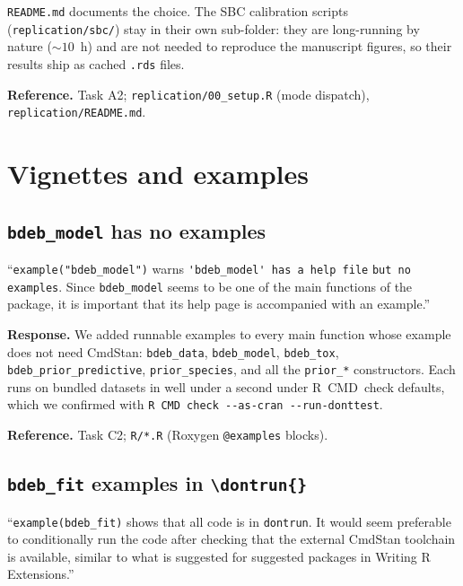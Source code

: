 \documentclass[11pt,a4paper]{article}
\newcommand{\code}[1]{\texttt{#1}}
\begin{document}
\code{README.md} documents the choice. The SBC calibration scripts
(\code{replication/sbc/}) stay in their own sub-folder: they are
long-running by nature ($\sim 10$~h) and are not needed to reproduce the
manuscript figures, so their results ship as cached \code{.rds} files.

\textbf{Reference.} Task A2; \code{replication/00\_setup.R} (mode
dispatch), \code{replication/README.md}.

\section{Vignettes and examples}

\subsection{\code{bdeb\_model} has no examples}

\begin{displayquote}
``\verb|example("bdeb_model")| warns
\verb|'bdeb_model' has a help file|\allowbreak{} \verb|but no examples|. Since
\code{bdeb\_model} seems to be one of the main functions of the
package, it is important that its help page is accompanied with an
example.''
\end{displayquote}

\textbf{Response.} We added runnable examples to every main function
whose example does not need CmdStan: \code{bdeb\_data},
\code{bdeb\_model}, \code{bdeb\_tox}, \code{bdeb\_prior\_predictive},
\code{prior\_species}, and all the \code{prior\_*} constructors. Each runs
on bundled datasets in well under a second under R~CMD~check defaults,
which we confirmed with \verb|R CMD check --as-cran --run-donttest|.

\textbf{Reference.} Task C2; \code{R/*.R}
(Roxygen \code{@examples} blocks).

\subsection{\code{bdeb\_fit} examples in \code{\textbackslash dontrun\{\}}}

\begin{displayquote}
``\verb|example(bdeb_fit)| shows that all code is in
\code{dontrun}. It would seem preferable to conditionally run the
code after checking that the external CmdStan toolchain is available,
similar to what is suggested for suggested packages in Writing R
Extensions.''
\end{displayquote}
\end{document}
